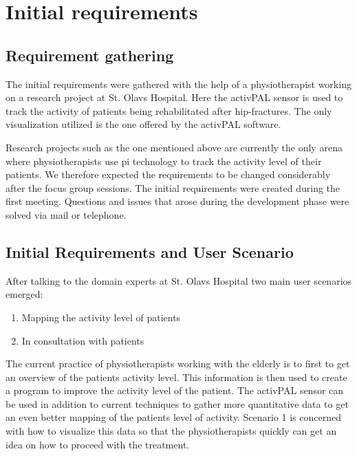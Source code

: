 \chapter{Initial requirements}
\label{ch:initialRequirements}
\section{Requirement gathering}
The initial requirements were gathered with the help of a physiotherapist working on a research project at St. Olavs Hospital. Here the activPAL sensor is used to track the activity of patients being rehabilitated after hip-fractures. The only visualization utilized is the one offered by the activPAL software.

Research projects such as the one mentioned above are currently the only arena where physiotherapists use \gls{pi} technology to track the activity level of their patients. We therefore expected the requirements to be changed considerably after the focus group sessions. The initial requirements were created during the first meeting. Questions and issues that arose during the development phase were solved via mail or telephone.

\section{Initial Requirements and User Scenario}
After talking to the domain experts at St. Olavs Hospital two main user scenarios emerged:
\vspace{-3mm}
\begin{enumerate}[itemsep=0cm, parsep=0cm]
  \item Mapping the activity level of patients
  \item In consultation with patients
\end{enumerate}

The current practice of physiotherapists working with the elderly is to first to get an overview of the patients activity level. This information is then used to create a program to improve the activity level of the patient. The activPAL sensor can be used in addition to current techniques to gather more quantitative data to get an even better mapping of the patients level of activity. Scenario 1 is concerned with how to visualize this data so that the physiotherapists quickly can get an idea on how to proceed with the treatment.

